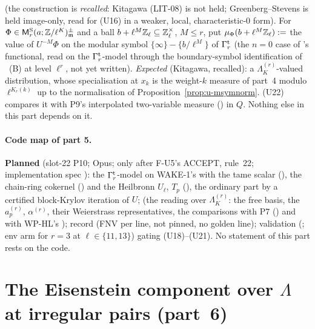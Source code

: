 \documentclass[11pt]{article}
\newcommand{\Iw}{\Lambda}                         %
\newcommand{\cusp}{\mathrm{S}}
\newcommand{\Zl}{\Z_\ell}
\newcommand{\GaT}[1]{\Ga^{\mathrm t}_{#1}}            %
\newcommand{\IwT}[2]{\Iw^{(#2)}_{#1}}                 %
\begin{document}
\begin{remark}\label{rmk:u-towerkitagawa}
\CONJ{} (the construction is \emph{recalled}: Kitagawa (LIT-08) is not held; Greenberg--Stevens \cite{greenberg_stevens} is held image-only, read for (U16) in a weaker, local,
characteristic-$0$ form). For $\Phi\in\mathsf M^{\cusp}_r(a;\Z/\ell^{K})^{\pm}_{\mathfrak m}$ and a ball $b+\ell^{M}\Zl\subseteq\Zl^{\times}$, $M\le r$, put $\mu_\Phi(b+\ell^{M}\Zl):=$ the value of
$U^{-M}\Phi$ on the modular symbol $\{\infty\}-\{b/\ell^{M}\}$ of $\GaT r$ (the $n=0$ case of 's functional, read on the $\GaT r$-model through the
boundary-symbol identification of ~(B) at level $\ell^{r}$, not yet written). \emph{Expected} (Kitagawa, recalled): a $\IwT Kr$-valued distribution, whose
specialisation at $x_k$ is the weight-$k$ measure of part~4 modulo $\ell^{K_r(k)}$ up to the normalisation of Proposition~\ref{prop:u-msymnorm}. (U22) compares it with P9's interpolated
two-variable measure () in $Q$. Nothing else in this part depends on it.
\end{remark}

\paragraph{Code map of part 5.} \textbf{Planned} (slot-22 P10; Opus; only after F-U5's ACCEPT, rule~22; implementation spec ): the $\GaT r$-model on
WAKE-1's  with the tame scalar (), the chain-ring cokernel () and the Heilbronn $U_\ell$, $T_p$
(), the ordinary part by a certified block-Krylov iteration of $U$;  (the reading over $\IwT Kr$: the free basis, the
$a^{(r)}_p$, $\alpha^{(r)}$, their Weierstrass representatives, the comparisons with P7 () and with WP-HL's ); record
 (FNV per line, not pinned, no golden line); validation  (; env arm  for
$r=3$ at $\ell\in\{11,13\}$) gating (U18)--(U21). No statement of this part rests on the code.

\section{The Eisenstein component over \texorpdfstring{$\Iw$}{Lambda} at irregular pairs (part~6)}\label{sec:u-eislambda}
\end{document}
